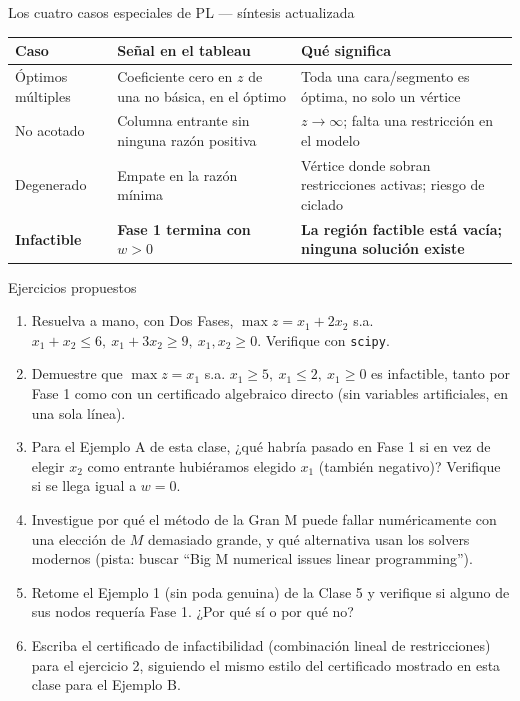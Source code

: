 \documentclass[aspectratio=169]{beamer}
\begin{document}
\begin{frame}{Los cuatro casos especiales de PL --- síntesis actualizada}
\begin{center}
\small
\renewcommand{\arraystretch}{1.35}
\begin{tabular}{@{}p{2.6cm}p{4.6cm}p{4.6cm}@{}}
\toprule
\textbf{Caso} & \textbf{Señal en el tableau} & \textbf{Qué significa}\\
\midrule
Óptimos múltiples & Coeficiente cero en $z$ de una no básica, en el óptimo & Toda una cara/segmento es óptima, no solo un vértice\\
No acotado & Columna entrante sin ninguna razón positiva & $z\to\infty$; falta una restricción en el modelo\\
Degenerado & Empate en la razón mínima & Vértice donde sobran restricciones activas; riesgo de ciclado\\
\textbf{Infactible} & \textbf{Fase 1 termina con $w>0$} & \textbf{La región factible está vacía; ninguna solución existe}\\
\bottomrule
\end{tabular}
\end{center}
\normalsize
\end{frame}

\begin{frame}{Ejercicios propuestos}
\small
\begin{enumerate}
\setlength{\itemsep}{2pt}
\item Resuelva a mano, con Dos Fases, $\max z=x_1+2x_2$ s.a. $x_1+x_2\leq6,\ x_1+3x_2\geq9,\ x_1,x_2\geq0$. Verifique con \texttt{scipy}.
\item Demuestre que $\max z=x_1$ s.a. $x_1\geq5,\ x_1\leq2,\ x_1\geq0$ es infactible, tanto por Fase 1 como con un certificado algebraico directo (sin variables artificiales, en una sola línea).
\item Para el Ejemplo A de esta clase, ¿qué habría pasado en Fase 1 si en vez de elegir $x_2$ como entrante hubiéramos elegido $x_1$ (también negativo)? Verifique si se llega igual a $w=0$.
\item Investigue por qué el método de la Gran M puede fallar numéricamente con una elección de $M$ demasiado grande, y qué alternativa usan los solvers modernos (pista: buscar ``Big M numerical issues linear programming'').
\item Retome el Ejemplo 1 (sin poda genuina) de la Clase 5 y verifique si alguno de sus nodos requería Fase 1. ¿Por qué sí o por qué no?
\item Escriba el certificado de infactibilidad (combinación lineal de restricciones) para el ejercicio 2, siguiendo el mismo estilo del certificado mostrado en esta clase para el Ejemplo B.
\end{enumerate}
\end{frame}
\end{document}
